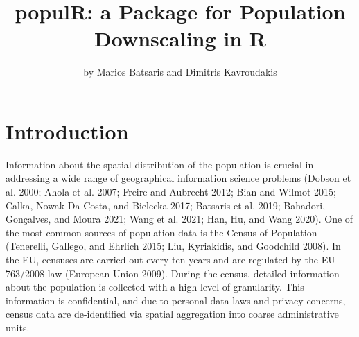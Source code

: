 \title{populR: a Package for Population Downscaling in R}
\author{by Marios Batsaris and Dimitris Kavroudakis}

\maketitle


\hypertarget{introduction}{%
\section{Introduction}\label{introduction}}

Information about the spatial distribution of the population is crucial in addressing a wide range of geographical information science problems (Dobson et al. 2000; Ahola et al. 2007; Freire and Aubrecht 2012; Bian and Wilmot 2015; Calka, Nowak Da Costa, and Bielecka 2017; Batsaris et al. 2019; Bahadori, Gonçalves, and Moura 2021; Wang et al. 2021; Han, Hu, and Wang 2020). One of the most common sources of population data is the Census of Population (Tenerelli, Gallego, and Ehrlich 2015; Liu, Kyriakidis, and Goodchild 2008). In the EU, censuses are carried out every ten years and are regulated by the EU 763/2008 law (European Union 2009). During the census, detailed information about the population is collected with a high level of granularity. This information is confidential, and due to personal data laws and privacy concerns, census data are de-identified via spatial aggregation into coarse administrative units.

